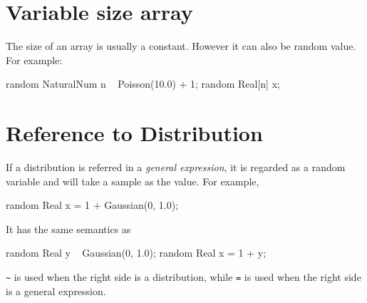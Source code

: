 \documentclass[12pt]{article}
\begin{document}
{\section{Variable size array}
The size of an array is usually a constant. However it can also be random value.
For example:
\begin{blogcode}
random NaturalNum n ~ Poisson(10.0) + 1;
random Real[n] x;
\end{blogcode}


\section{Reference to Distribution}
If a distribution is referred in a \emph{general expression}, it is regarded as a random variable and will take a sample as the value.
For example, 
\begin{blogcode}
random Real x = 1 + Gaussian(0, 1.0);
\end{blogcode}
It has the same semantics as
\begin{blogcode}
random Real y ~ Gaussian(0, 1.0);
random Real x = 1 + y;
\end{blogcode}
\texttt{\~{}} is used when the right side is a distribution, while \texttt{=} is used when the right side is a general expression. 
}

\end{document}
